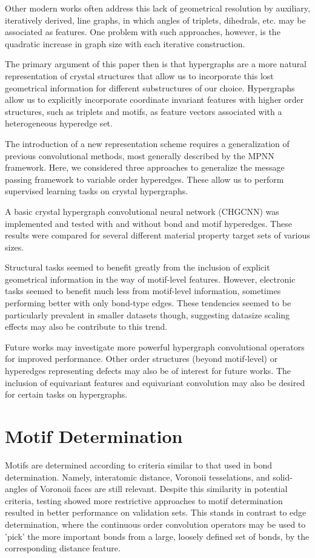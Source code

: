 \documentclass[10pt,a4paper]{article}
\begin{document}
Other modern works often address this lack of geometrical resolution by auxiliary, iteratively derived, line graphs, in which angles of triplets, dihedrals, etc. may be associated as features. One problem with such approaches, however, is the quadratic increase in graph size with each iterative construction.

The primary argument of this paper then is that hypergraphs are a more natural representation of crystal structures that allow us to incorporate this lost geometrical information for different substructures of our choice.  Hypergraphs allow us to explicitly incorporate coordinate invariant features with higher order structures, such as triplets and motifs, as feature vectors associated with a heterogeneous hyperedge set.

The introduction of a new representation scheme requires a generalization of previous convolutional methods, most generally described by the MPNN framework. Here, we considered three approaches to generalize the message passing framework to variable order hyperedges. These allow us to perform supervised learning tasks on crystal hypergraphs.

A basic crystal hypergraph convolutional neural network (CHGCNN) was implemented and tested with and without bond and motif hyperedges. These results were compared for several different material property target sets of various sizes.

Structural tasks seemed to benefit greatly from the inclusion of explicit geometrical information in the way of motif-level features. However, electronic tasks seemed to benefit much less from motif-level information, sometimes performing better with only bond-type edges. These tendencies seemed to be particularly prevalent in smaller datasets though, suggesting datasize scaling effects may also be contribute to this trend.

Future works may investigate more powerful hypergraph convolutional  operators for improved performance. Other order structures (beyond motif-level) or hyperedges representing defects may also be of interest for future works. The inclusion of equivariant features and equivariant convolution may also be desired for certain tasks on hypergraphs.




\nocite{*}




\appendix

\section{Motif Determination}
Motifs are determined according to criteria similar to that used in bond determination. Namely, interatomic distance, Voronoii tesselations, and solid-angles of Voronoii faces are still relevant. Despite this similarity in potential criteria, testing showed more restrictive approaches to motif determination resulted in better performance on validation sets. This stands in contrast to edge determination, where the continuous order convolution operators may be used to 'pick' the more important bonds from a large, loosely defined set of bonds, by the corresponding distance feature.
\end{document}
